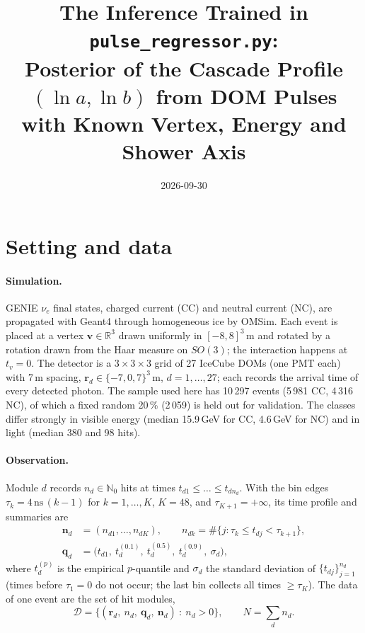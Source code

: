 \documentclass[11pt]{article}
\title{The Inference Trained in \texttt{pulse\_regressor.py}:\\
Posterior of the Cascade Profile $(\ln a, \ln b)$ from DOM Pulses\\
with Known Vertex, Energy and Shower Axis}
\author{}
\date{2026-09-30}
\theoremstyle{definition}
\newcommand{\D}{\mathcal{D}}
\newcommand{\R}{\mathbb{R}}
\begin{document}
\maketitle

\section{Setting and data}

\paragraph{Simulation.}
GENIE $\nu_e$ final states, charged current (CC) and neutral current (NC), are propagated with Geant4 through
homogeneous ice by OMSim. Each event is placed at a vertex $\bm v\in\R^3$ drawn uniformly in $[-8,8]^3$\,m and
rotated by a rotation drawn from the Haar measure on $SO(3)$; the interaction happens at $t_v=0$. The detector is
a $3\times3\times3$ grid of 27 IceCube DOMs (one PMT each) with 7\,m spacing, $\bm r_d\in\{-7,0,7\}^3$\,m,
$d=1,\dots,27$; each records the arrival time of every detected photon. The sample used here has 10\,297 events
(5\,981 CC, 4\,316 NC), of which a fixed random 20\,\% (2\,059) is held out for validation. The classes differ
strongly in visible energy (median 15.9\,GeV for CC, 4.6\,GeV for NC) and in light (median 380 and 98 hits).

\paragraph{Observation.}
Module $d$ records $n_d\in\mathbb{N}_0$ hits at times $t_{d1}\le\dots\le t_{dn_d}$. With the bin edges
$\tau_k = 4\,\text{ns}\,(k-1)$ for $k=1,\dots,K$, $K=48$, and $\tau_{K+1}=+\infty$, its time profile and
summaries are
\begin{align}
  \bm n_d &= (n_{d1},\dots,n_{dK}),\qquad n_{dk} = \#\{j : \tau_k \le t_{dj} < \tau_{k+1}\},
  \label{eq:hist}\\
  \bm q_d &= \big(t_{d1},\ t^{(0.1)}_d,\ t^{(0.5)}_d,\ t^{(0.9)}_d,\ \sigma_d\big),
\end{align}
where $t^{(p)}_d$ is the empirical $p$-quantile and $\sigma_d$ the standard deviation of $\{t_{dj}\}_{j=1}^{n_d}$
(times before $\tau_1=0$ do not occur; the last bin collects all times $\ge\tau_K$). The data of one event are the
set of hit modules,
\begin{equation}
  \D = \big\{(\bm r_d,\ n_d,\ \bm q_d,\ \bm n_d)\ :\ n_d>0\big\},\qquad N = \sum_{d} n_d .
  \label{eq:data}
\end{equation}
\end{document}

